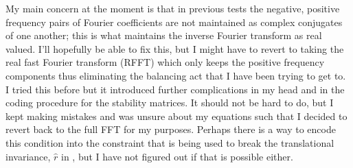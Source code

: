 \begin{description}
{\begin{description}
My main concern at the moment is that in previous tests the negative, positive frequency pairs of Fourier
coefficients are not maintained as complex conjugates of one another; this is what maintains the
inverse Fourier transform as real valued. I'll hopefully be able to fix this, but I might have to revert to taking
the real fast Fourier transform (RFFT) which only keeps the positive frequency
components thus eliminating the balancing act that I have been trying to get to. I tried this before but it introduced further complications
in my head and in the coding procedure for the stability matrices. It should not be hard to do, but I kept making mistakes
and  was unsure about my equations such that I
decided to revert back to the full FFT for my purposes. Perhaps there is a way to encode this condition into the constraint
that is being used to break the translational invariance, $\hat{r}$ in , but I have not figured out if that
is possible either.


\end{description}}
\end{description}
